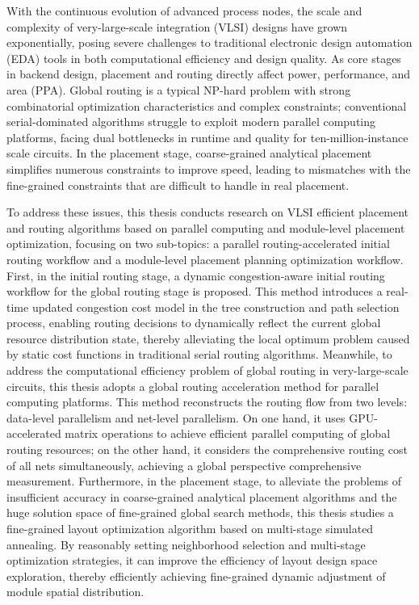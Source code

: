 \begin{abstract*}
  With the continuous evolution of advanced process nodes, the scale and complexity of very-large-scale integration (VLSI) designs have grown exponentially, posing severe challenges to traditional electronic design automation (EDA) tools in both computational efficiency and design quality. As core stages in backend design, placement and routing directly affect power, performance, and area (PPA). Global routing is a typical NP-hard problem with strong combinatorial optimization characteristics and complex constraints; conventional serial-dominated algorithms struggle to exploit modern parallel computing platforms, facing dual bottlenecks in runtime and quality for ten-million-instance scale circuits. In the placement stage, coarse-grained analytical placement simplifies numerous constraints to improve speed, leading to mismatches with the fine-grained constraints that are difficult to handle in real placement.

  To address these issues, this thesis conducts research on VLSI efficient placement and routing algorithms based on parallel computing and module-level placement optimization, focusing on two sub-topics: a parallel routing-accelerated initial routing workflow and a module-level placement planning optimization workflow. First, in the initial routing stage, a dynamic congestion-aware initial routing workflow for the global routing stage is proposed. This method introduces a real-time updated congestion cost model in the tree construction and path selection process, enabling routing decisions to dynamically reflect the current global resource distribution state, thereby alleviating the local optimum problem caused by static cost functions in traditional serial routing algorithms. Meanwhile, to address the computational efficiency problem of global routing in very-large-scale circuits, this thesis adopts a global routing acceleration method for parallel computing platforms. This method reconstructs the routing flow from two levels: data-level parallelism and net-level parallelism. On one hand, it uses GPU-accelerated matrix operations to achieve efficient parallel computing of global routing resources; on the other hand, it considers the comprehensive routing cost of all nets simultaneously, achieving a global perspective comprehensive measurement. Furthermore, in the placement stage, to alleviate the problems of insufficient accuracy in coarse-grained analytical placement algorithms and the huge solution space of fine-grained global search methods, this thesis studies a fine-grained layout optimization algorithm based on multi-stage simulated annealing. By reasonably setting neighborhood selection and multi-stage optimization strategies, it can improve the efficiency of layout design space exploration, thereby efficiently achieving fine-grained dynamic adjustment of module spatial distribution.


\end{abstract*}
